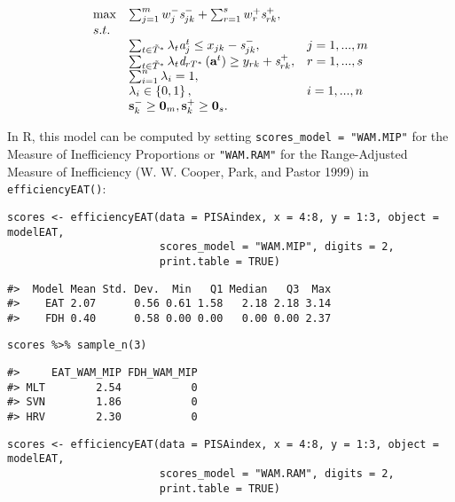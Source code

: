 \begin{equation} \label{(33)} 
\begin{array}{lllll} 
{} & {\max } & {\sum_{j=1}^{m}w_{j}^{-} {\it s}_{jk}^{-} +\sum_{r=1}^{s}w_{r}^{+} {\it s}_{rk}^{+},} & {} & {} \\ 
{} & {s.t.} & {} & {} & {} \\ 
{} & {} & {\sum_{t\in \tilde{T}^{*}}^{}\lambda_{t} {\it a}_{j}^{t}  \le x_{jk} - {\it s}_{jk}^{-} ,} & {j=1,...,m} & {} \\
{} & {} & {\sum_{t\in \tilde{T}^{*}}^{}\lambda_{t} {\it d}_{rT^{*}} \left({\it \textbf{a}}^{t} \right) \ge y_{rk} +{\it s}_{rk}^{+} ,} & {r=1,...,s} & {} \\ 
{} & {} & {\sum_{i=1}^{n}\lambda_{i} = 1,} & {} & {} \\ 
{} & {} & {\lambda _{i} \in \left\{0,1\right\},} & {i=1,...,n} & {} \\ 
{} & {} & {{\it \textbf{s}}_{k}^{-} \ge \textbf{0}_{m}, {\it \textbf{s}}_{k}^{+} \ge \textbf{0}_{s}.} 
\end{array}
\end{equation}

In R, this model can be computed by setting \texttt{scores\_model\ =\ "WAM.MIP"} for the Measure of Inefficiency Proportions or \texttt{"WAM.RAM"} for the Range-Adjusted Measure of Inefficiency (W. W. Cooper, Park, and Pastor 1999) in \texttt{efficiencyEAT()}:

\begin{verbatim}
scores <- efficiencyEAT(data = PISAindex, x = 4:8, y = 1:3, object = modelEAT, 
                        scores_model = "WAM.MIP", digits = 2,
                        print.table = TRUE)
\end{verbatim}

\begin{verbatim}
#>  Model Mean Std. Dev.  Min   Q1 Median   Q3  Max
#>    EAT 2.07      0.56 0.61 1.58   2.18 2.18 3.14
#>    FDH 0.40      0.58 0.00 0.00   0.00 0.00 2.37
\end{verbatim}

\begin{verbatim}
scores %>% sample_n(3)
\end{verbatim}

\begin{verbatim}
#>     EAT_WAM_MIP FDH_WAM_MIP
#> MLT        2.54           0
#> SVN        1.86           0
#> HRV        2.30           0
\end{verbatim}

\begin{verbatim}
scores <- efficiencyEAT(data = PISAindex, x = 4:8, y = 1:3, object = modelEAT,
                        scores_model = "WAM.RAM", digits = 2,
                        print.table = TRUE)
\end{verbatim}


